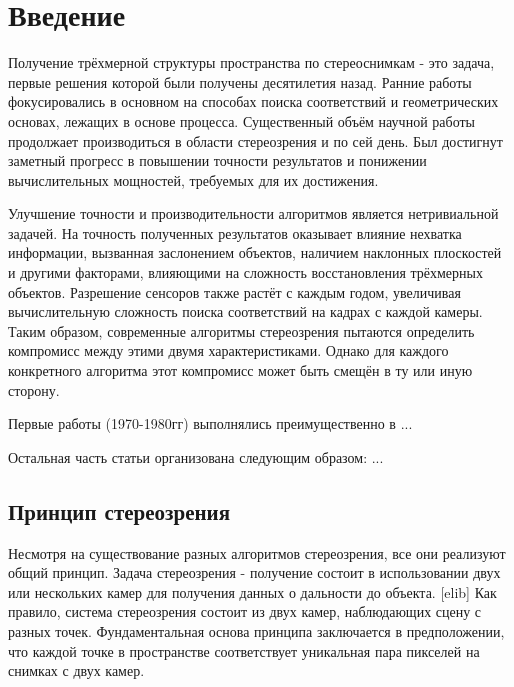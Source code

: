 





\tableofcontents
\newpage


\section{Введение}

Получение трёхмерной структуры пространства по стереоснимкам - это задача, первые решения которой
были получены десятилетия назад. Ранние работы фокусировались в основном на способах поиска соответствий
и геометрических основах, лежащих в основе процесса. Существенный объём научной работы продолжает
 производиться в области стереозрения и по сей день. Был достигнут заметный прогресс в повышении точности результатов и понижении вычислительных мощностей, требуемых для 
их достижения. 

Улучшение точности и производительности алгоритмов является нетривиальной задачей. На точность 
полученных результатов оказывает влияние нехватка информации, вызванная заслонением объектов, наличием наклонных
плоскостей и другими факторами, влияющими на сложность восстановления трёхмерных объектов. Разрешение
сенсоров также растёт с каждым годом, увеличивая вычислительную сложность поиска соответствий на кадрах с 
каждой камеры. Таким образом, современные алгоритмы стереозрения пытаются определить компромисс между этими
 двумя характеристиками. Однако для каждого конкретного алгоритма этот компромисс может быть смещён в 
 ту или иную сторону. 



Первые работы (1970-1980гг) выполнялись преимущественно в ...


Остальная часть статьи организована следующим образом:
...

\subsection{Принцип стереозрения}

Несмотря на существование разных алгоритмов стереозрения, все они реализуют общий принцип. Задача стереозрения - 
получение состоит в использовании двух или нескольких камер для получения данных о дальности до объекта. [elib] 
Как правило, система стереозрения состоит из двух камер, наблюдающих сцену с разных точек. Фундаментальная основа принципа
заключается в предположении, что каждой точке в пространстве соответствует уникальная пара пикселей на снимках с двух камер.  

